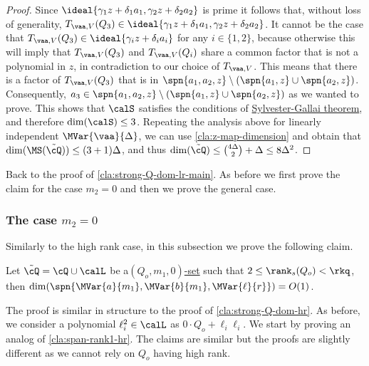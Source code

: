 \begin{proof}
	Since $\ideal{\gamma_1 z + \delta_1 a_1, \gamma_2 z + \delta_2 a_2}$ is prime it follows that, without loss of generality, $T_{\vaa,V}(Q_3)\in\ideal{\gamma_1 z + \delta_1 a_1, \gamma_2 z + \delta_2 a_2}$. It cannot be the case that $T_{\vaa,V}(Q_3)\in\ideal{\gamma_i z + \delta_i a_i}$ for any $i \in \{1,2\}$, because otherwise this will imply that $T_{\vaa,V}(Q_3)$ and $T_{\vaa,V}(Q_i)$ share a common factor that is not a polynomial in $z$, in contradiction to our choice of $T_{\vaa, V}$. This means that there is a factor of $T_{\vaa,V}(Q_3)$ that is in $\spn{a_1,a_2,z} \setminus \left(\spn{a_1,z}\cup \spn{a_2,z}\right)$.
	Consequently, $a_3 \in \spn{a_1,a_2,z} \setminus \left(\spn{a_1,z}\cup \spn{a_2,z}\right)$ as we wanted to prove.
	This shows that $\calS$ satisfies the conditions of \hyperref[thm:SG-linforms]{Sylvester-Gallai theorem}, and therefore $\dim(\calS)\leq 3$. Repeating the analysis above for linearly independent $\MVar{\vaa}{\Delta}$, we can use \autoref{cla:z-map-dimension} and obtain that $\dim(\MS(\tilde\cQ)) \leq (3+1)\Delta$, and thus $\dim(\tilde{\cQ}) \leq {4\Delta \choose 2}+\Delta \leq 8\Delta^2$. 
\end{proof}



Back to the proof of \autoref{cla:strong-Q-dom-lr-main}. As before we first prove the claim for the case $m_2=0$ and then we prove the general case.

\subsubsection{The case $m_2=0$}

Similarly to the high rank case, in this subsection we prove the following claim.
\begin{claim}\label{cla:strong-Q-dom}
Let $\tilde{\cQ} = \cQ\cup \calL$ be a\hyperref[def:Q-dom]{$(Q_o,m_1,0)$-set} such that $2\leq \rank_s(Q_o)< \rkq$,
then  $\dim(\spn{\MVar{a}{m_1},\MVar{b}{m_1},\MVar{\ell}{r}}) = O(1)$.
\end{claim}

The proof is similar in structure to the proof of \autoref{cla:strong-Q-dom-hr}.
As before, we consider a polynomial $\ell_i^2\in \calL$ as $0\cdot Q_o+ \ell_i\ell_i$.
We start by proving an analog of \autoref{cla:span-rank1-hr}. The claims are similar but the proofs are slightly different as we cannot rely on $Q_o$ having high rank. 

